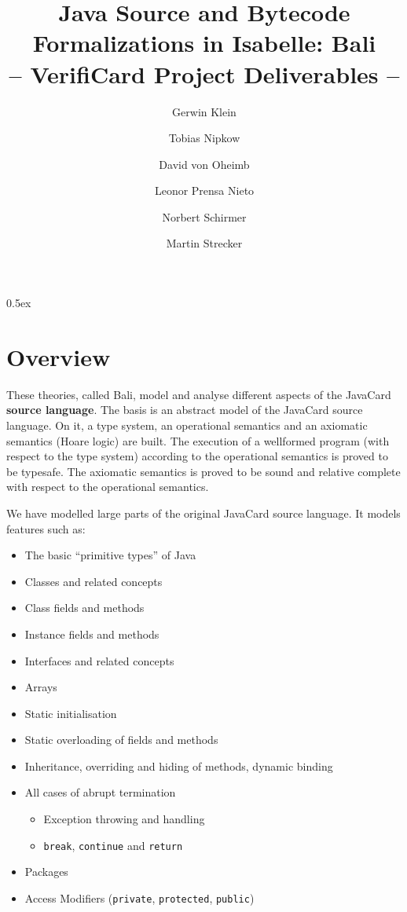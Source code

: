\documentclass[11pt,a4paper]{book}
\begin{document}
\title{Java Source and Bytecode Formalizations in Isabelle: Bali\\
  {\large -- VerifiCard Project Deliverables -- }}
\author{Gerwin Klein \and Tobias Nipkow \and David von Oheimb \and
  Leonor Prensa Nieto \and Norbert Schirmer \and Martin Strecker}
\maketitle

\tableofcontents

\parindent 0pt\parskip 0.5ex
\chapter{Overview}
These theories, called Bali,  model and analyse different aspects of the 
JavaCard \textbf{source language}. 
The basis is an abstract model of the JavaCard source language. 
On it, a type system, an operational semantics and an axiomatic semantics 
(Hoare logic) are built. The execution of a wellformed program (with respect to
the type system) according to the operational semantics is proved to be 
typesafe. The axiomatic semantics is proved to be sound and relative complete 
with respect to the operational semantics.

We have modelled large parts of the original JavaCard source language. It models
features such as:
\begin{itemize}
\item The basic ``primitive types'' of Java 
\item Classes and related concepts 
\item Class fields and methods
\item Instance fields and methods
\item Interfaces and related concepts 
\item Arrays
\item Static initialisation
\item Static overloading of fields and methods
\item Inheritance, overriding and hiding of methods, dynamic binding
\item All cases of abrupt termination
      \begin{itemize}
        \item Exception throwing and handling
        \item \texttt{break}, \texttt{continue} and \texttt{return} 
      \end{itemize}
\item Packages
\item Access Modifiers (\texttt{private}, \texttt{protected}, \texttt{public})
\end{itemize}
\end{document}
